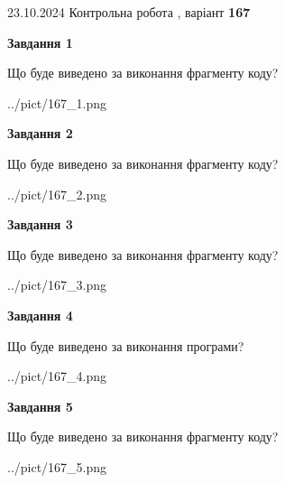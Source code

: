 \documentclass[12pt, ukrainian]{article}
\begin{document}
{\Large{23.10.2024 Контрольна робота , варіант  \No \textbf { 167 }\par}}
{
\begin {large}
{\begin {center}\textbf{Завдання 1}\end {center}}

Що буде виведено за виконання фрагменту коду?\par
\begin{center}
	{../pict/167_1.png}
\end{center}
\newpage

{\begin {center}\textbf{Завдання 2}\end {center}}

Що буде виведено за виконання фрагменту коду?\par
\begin{center}
	{../pict/167_2.png}
\end{center}
\newpage

{\begin {center}\textbf{Завдання 3}\end {center}}

Що буде виведено за виконання фрагменту коду?\par
\begin{center}
	{../pict/167_3.png}
\end{center}
\newpage

{\begin {center}\textbf{Завдання 4}\end {center}}

Що буде виведено за виконання програми?\par
\begin{center}
	{../pict/167_4.png}
\end{center}
\newpage

{\begin {center}\textbf{Завдання 5}\end {center}}

Що буде виведено за виконання фрагменту коду?\par
\begin{center}
	{../pict/167_5.png}
\end{center}
\newpage


\end{large}}
\end{document}
